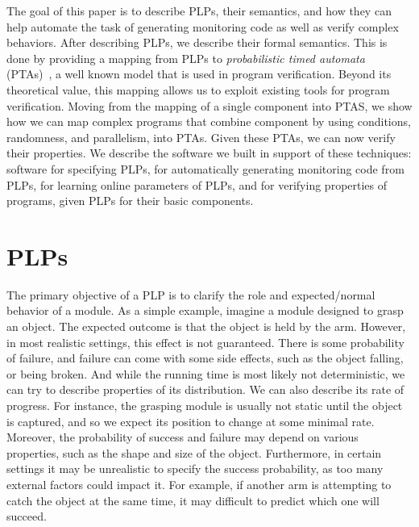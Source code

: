 \documentclass[ 5p, 12pt, times, twocolumn, sort&compress ]{elsarticle}
\begin{document}
The goal of this paper is to describe PLPs, their semantics, and how they can help automate the task of generating monitoring code as well as verify complex behaviors. After describing PLPs, we describe their formal semantics. This is done by providing a mapping from PLPs to \textit{probabilistic timed automata} (PTAs)~\cite{}, a well known model that is used in program verification. Beyond its theoretical value, this mapping allows us to exploit existing tools for program verification. Moving from the mapping of
a single component into PTAS, we show how we can map complex programs that combine component by using
conditions, randomness, and parallelism, into PTAs.
Given these PTAs, we can now verify their properties.
We describe the software we built in support of these techniques: software for specifying PLPs, for automatically generating monitoring code from PLPs,
for learning online parameters of PLPs, and for verifying properties of programs, given PLPs for their basic components. 




\section{PLPs}
The primary objective of a PLP is to clarify the role and expected/normal behavior of a module. As a simple example, imagine a module designed to grasp an object. The expected outcome is that the object is held by the arm. However, in most realistic settings, this effect is not guaranteed. There is some probability of failure, and failure can come with some side effects, such as the object falling, or being broken. And while the running time is most likely not deterministic,  we can try to describe properties of its distribution. We can also describe its rate of progress. For instance, the grasping module is usually not static until the object is
captured, and so we expect its position to change at some minimal rate.
Moreover, the probability of success and failure may depend on various properties, such as the shape and size of the object.
Furthermore, in certain settings it may be unrealistic to specify the success probability, as too many external factors could impact it. For example, if another arm is attempting to catch the object at the same time, it may difficult to predict which one will succeed.
\end{document}
